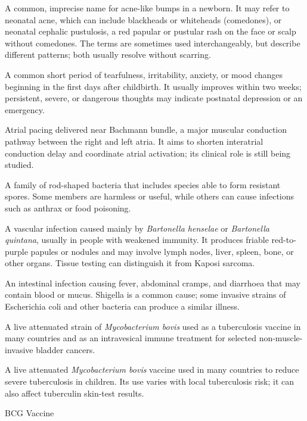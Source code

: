  A common, imprecise name for acne-like bumps in a newborn. It may refer to neonatal acne, which can include blackheads or whiteheads (comedones), or neonatal cephalic pustulosis, a red papular or pustular rash on the face or scalp without comedones. The terms are sometimes used interchangeably, but describe different patterns; both usually resolve without scarring.

 A common short period of tearfulness, irritability, anxiety, or mood changes beginning in the first days after childbirth. It usually improves within two weeks; persistent, severe, or dangerous thoughts may indicate postnatal depression or an emergency.

 Atrial pacing delivered near Bachmann bundle, a major muscular conduction pathway between the right and left atria. It aims to shorten interatrial conduction delay and coordinate atrial activation; its clinical role is still being studied.

 A family of rod-shaped bacteria that includes species able to form resistant spores. Some members are harmless or useful, while others can cause infections such as anthrax or food poisoning.

 A vascular infection caused mainly by
\textit{Bartonella henselae} or \textit{Bartonella quintana}, usually in people
with weakened immunity. It produces friable red-to-purple papules or nodules
and may involve lymph nodes, liver, spleen, bone, or other organs. Tissue
testing can distinguish it from Kaposi sarcoma.

 An intestinal infection causing fever, abdominal cramps, and diarrhoea that may contain blood or mucus. Shigella is a common cause; some invasive strains of Escherichia coli and other bacteria can produce a similar illness.

 A live attenuated strain of \textit{Mycobacterium bovis} used as a tuberculosis vaccine in many countries and as an intravesical immune treatment for selected non-muscle-invasive bladder cancers.

 A live attenuated \textit{Mycobacterium bovis} vaccine used in many countries to reduce severe tuberculosis in children. Its use varies with local tuberculosis risk; it can also affect tuberculin skin-test results.

\synonyms
BCG Vaccine

